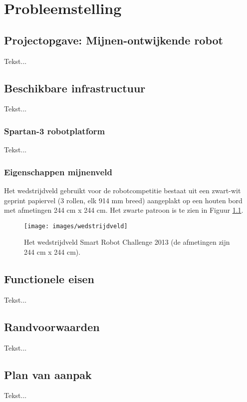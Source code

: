 \chapter[Probleemstelling]{Probleemstelling} \label {chapter:probleemstelling}

	\section{Projectopgave: Mijnen-ontwijkende robot}
		Tekst...
	
	\section{Beschikbare infrastructuur}
		Tekst...
		\subsection{Spartan-3 robotplatform}
			Tekst...
		\subsection{Eigenschappen mijnenveld}
			Het wedstrijdveld gebruikt voor de robotcompetitie bestaat uit een zwart-wit geprint papiervel 
			(3 rollen, elk 914 mm breed) aangeplakt op een houten bord met afmetingen 244 cm x 244 cm. Het 
			zwarte patroon is te zien in Figuur \ref{figure:wedstrijdveld}.
	        \begin{figure}[ht]
				\texttt{[image: images/wedstrijdveld]}
                    \caption{Het wedstrijdveld Smart Robot Challenge 2013 (de afmetingen zijn 244 cm x 244 cm).}
                    \label{figure:wedstrijdveld}
            \end{figure}
	\section{Functionele eisen}
			Tekst...
	\section{Randvoorwaarden}
			Tekst...
	\section{Plan van aanpak}
			Tekst...
